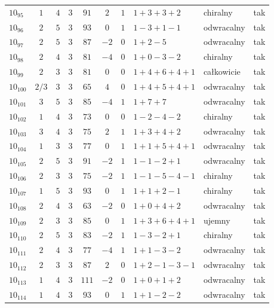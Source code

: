 \begin{longtable}{lccccccllc}
$10_{95}$  & $1$   & $4$ & $3$ & $91$  & $2$  & $1$ & $1+3+3+2$     & chiralny   & tak \\
$10_{96}$  & $2$   & $5$ & $3$ & $93$  & $0$  & $1$ & $1-3+1-1$     & odwracalny & tak \\
$10_{97}$  & $2$   & $5$ & $3$ & $87$  & $-2$ & $0$ & $1+2-5$       & odwracalny & tak \\
$10_{98}$  & $2$   & $4$ & $3$ & $81$  & $-4$ & $0$ & $1+0-3-2$     & chiralny   & tak \\
$10_{99}$  & $2$   & $3$ & $3$ & $81$  & $0$  & $0$ & $1+4+6+4+1$   & całkowicie & tak \\
$10_{100}$ & $2/3$ & $3$ & $3$ & $65$  & $4$  & $0$ & $1+4+5+4+1$   & odwracalny & tak \\
$10_{101}$ & $3$   & $5$ & $3$ & $85$  & $-4$ & $1$ & $1+7+7$       & odwracalny & tak \\
$10_{102}$ & $1$   & $4$ & $3$ & $73$  & $0$  & $0$ & $1-2-4-2$     & chiralny   & tak \\
$10_{103}$ & $3$   & $4$ & $3$ & $75$  & $2$  & $1$ & $1+3+4+2$     & odwracalny & tak \\
$10_{104}$ & $1$   & $3$ & $3$ & $77$  & $0$  & $1$ & $1+1+5+4+1$   & odwracalny & tak \\
$10_{105}$ & $2$   & $5$ & $3$ & $91$  & $-2$ & $1$ & $1-1-2+1$     & odwracalny & tak \\
$10_{106}$ & $2$   & $3$ & $3$ & $75$  & $-2$ & $1$ & $1-1-5-4-1$   & chiralny   & tak \\
$10_{107}$ & $1$   & $5$ & $3$ & $93$  & $0$  & $1$ & $1+1+2-1$     & chiralny   & tak \\
$10_{108}$ & $2$   & $4$ & $3$ & $63$  & $-2$ & $0$ & $1+0+4+2$     & odwracalny & tak \\
$10_{109}$ & $2$   & $3$ & $3$ & $85$  & $0$  & $1$ & $1+3+6+4+1$   & ujemny     & tak \\
$10_{110}$ & $2$   & $5$ & $3$ & $83$  & $-2$ & $1$ & $1-3-2+1$     & chiralny   & tak \\
$10_{111}$ & $2$   & $4$ & $3$ & $77$  & $-4$ & $1$ & $1+1-3-2$     & odwracalny & tak \\
$10_{112}$ & $2$   & $3$ & $3$ & $87$  & $2$  & $0$ & $1+2-1-3-1$   & odwracalny & tak \\
$10_{113}$ & $1$   & $4$ & $3$ & $111$ & $-2$ & $0$ & $1+0+1+2$     & odwracalny & tak \\
$10_{114}$ & $1$   & $4$ & $3$ & $93$  & $0$  & $1$ & $1+1-2-2$     & odwracalny & tak \\

\end{longtable}
